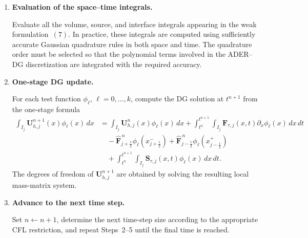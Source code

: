\documentclass[11pt]{article}
\begin{document}
\begin{enumerate}
    \item \textbf{Evaluation of the space--time integrals.}
    
    Evaluate all the volume, source, and interface integrals appearing
    in the weak formulation~\((7)\). In practice, these integrals are
    computed using sufficiently accurate Gaussian quadrature rules in
    both space and time. The quadrature order must be selected so that
    the polynomial terms involved in the ADER--DG discretization are
    integrated with the required accuracy.

    \item \textbf{One-stage DG update.}
    
    For each test function \(\phi_\ell\), \(\ell=0,\ldots,k\), compute
    the DG solution at \(t^{n+1}\) from the one-stage formula
    \[
    \begin{aligned}
        \int_{I_j}
        \mathbf{U}_{h,j}^{n+1}(x)\phi_\ell(x)\,dx
        &=
        \int_{I_j}
        \mathbf{U}_{h,j}^{n}(x)\phi_\ell(x)\,dx
        +
        \int_{t^n}^{t^{n+1}}\!\int_{I_j}
        \mathbf{F}_{\tau,j}(x,t)
        \partial_x\phi_\ell(x)\,dx\,dt
        \\
        &\quad
        -
        \widehat{\mathbf{F}}_{j+\frac12}^{\,n}
        \phi_\ell(x_{j+\frac12}^{-})
        +
        \widehat{\mathbf{F}}_{j-\frac12}^{\,n}
        \phi_\ell(x_{j-\frac12}^{+})
        \\
        &\quad
        +
        \int_{t^n}^{t^{n+1}}\!\int_{I_j}
        \mathbf{S}_{\tau,j}(x,t)
        \phi_\ell(x)\,dx\,dt .
    \end{aligned}
    \]
    The degrees of freedom of
    \(\mathbf{U}_{h,j}^{n+1}\) are obtained by solving the resulting
    local mass-matrix system.

    \item \textbf{Advance to the next time step.}
    
    Set \(n\leftarrow n+1\), determine the next time-step size according
    to the appropriate CFL restriction, and repeat Steps~2--5 until the
    final time is reached.

\end{enumerate}
\end{document}
